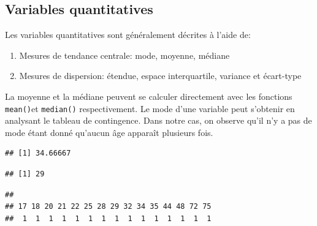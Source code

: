 \documentclass[
]{book}
\newenvironment{Shaded}{\begin{snugshade}}{\end{snugshade}}
\newcommand{\FunctionTok}[1]{\textcolor[rgb]{0.13,0.29,0.53}{\textbf{#1}}}
\newcommand{\NormalTok}[1]{#1}
\newcommand{\SpecialCharTok}[1]{\textcolor[rgb]{0.81,0.36,0.00}{\textbf{#1}}}
\providecommand{\tightlist}{%
  \setlength{\itemsep}{0pt}\setlength{\parskip}{0pt}}
\begin{document}
\subsection{Variables quantitatives}\label{variables-quantitatives}

Les variables quantitatives sont généralement décrites à l'aide de:

\begin{enumerate}
\def\labelenumi{\arabic{enumi}.}
\tightlist
\item
  Mesures de tendance centrale: mode, moyenne, médiane
\item
  Mesures de dispersion: étendue, espace interquartile, variance et écart-type
\end{enumerate}

La moyenne et la médiane peuvent se calculer directement avec les fonctions \texttt{mean()}et \texttt{median()} respectivement. Le mode d'une variable peut s'obtenir en analysant le tableau de contingence. Dans notre cas, on observe qu'il n'y a pas de mode étant donné qu'aucun âge apparaît plusieurs fois.

\begin{Shaded}
\end{Shaded}

\begin{verbatim}
## [1] 34.66667
\end{verbatim}

\begin{Shaded}
\end{Shaded}

\begin{verbatim}
## [1] 29
\end{verbatim}

\begin{Shaded}
\end{Shaded}

\begin{verbatim}
## 
## 17 18 20 21 22 25 28 29 32 34 35 44 48 72 75 
##  1  1  1  1  1  1  1  1  1  1  1  1  1  1  1
\end{verbatim}
\end{document}
